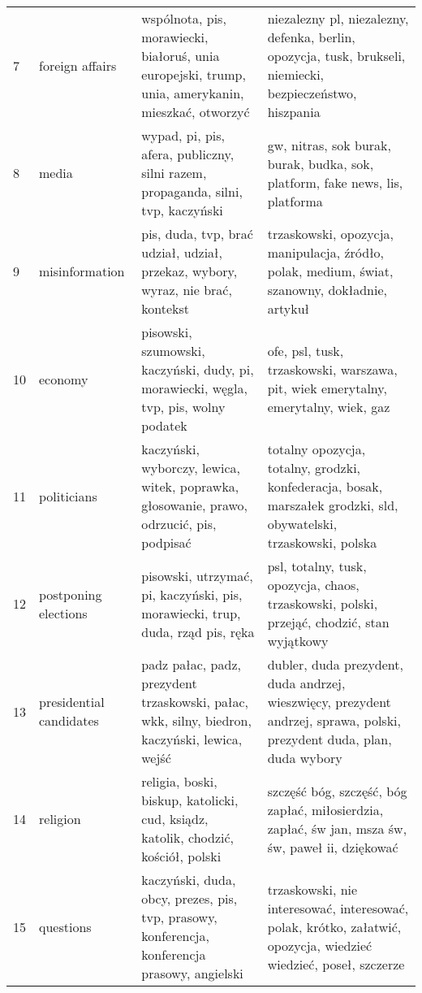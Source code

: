 \begin{tabular}{p{2cm}p{2cm}p{5cm}p{5cm}}
           7 &          foreign affairs &               wspólnota, pis, morawiecki, białoruś, unia europejski, trump, unia, amerykanin, mieszkać, otworzyć &              niezalezny pl, niezalezny, defenka, berlin, opozycja, tusk, brukseli, niemiecki, bezpieczeństwo, hiszpania \\
           8 &                    media &                                 wypad, pi, pis, afera, publiczny, silni razem, propaganda, silni, tvp, kaczyński &                                           gw, nitras, sok burak, burak, budka, sok, platform, fake news, lis, platforma \\
           9 &           misinformation &                                  pis, duda, tvp, brać udział, udział, przekaz, wybory, wyraz, nie brać, kontekst &                          trzaskowski, opozycja, manipulacja, źródło, polak, medium, świat, szanowny, dokładnie, artykuł \\
          10 &                  economy &                             pisowski, szumowski, kaczyński, dudy, pi, morawiecki, węgla, tvp, pis, wolny podatek &                                      ofe, psl, tusk, trzaskowski, warszawa, pit, wiek emerytalny, emerytalny, wiek, gaz \\
          11 &              politicians &                         kaczyński, wyborczy, lewica, witek, poprawka, głosowanie, prawo, odrzucić, pis, podpisać &       totalny opozycja, totalny, grodzki, konfederacja, bosak, marszałek grodzki, sld, obywatelski, trzaskowski, polska \\
          12 &     postponing elections &                                   pisowski, utrzymać, pi, kaczyński, pis, morawiecki, trup, duda, rząd pis, ręka &                              psl, totalny, tusk, opozycja, chaos, trzaskowski, polski, przejąć, chodzić, stan wyjątkowy \\
          13 &  presidential candidates &                    padz pałac, padz, prezydent trzaskowski, pałac, wkk, silny, biedron, kaczyński, lewica, wejść &  dubler, duda prezydent, duda andrzej, wieszwięcy, prezydent andrzej, sprawa, polski, prezydent duda, plan, duda wybory \\
          14 &                 religion &                                religia, boski, biskup, katolicki, cud, ksiądz, katolik, chodzić, kościół, polski &                        szczęść bóg, szczęść, bóg zapłać, miłosierdzia, zapłać, św jan, msza św, św, paweł ii, dziękować \\
          15 &                questions &                    kaczyński, duda, obcy, prezes, pis, tvp, prasowy, konferencja, konferencja prasowy, angielski &        trzaskowski, nie interesować, interesować, polak, krótko, załatwić, opozycja, wiedzieć wiedzieć, poseł, szczerze \\

\end{tabular}
